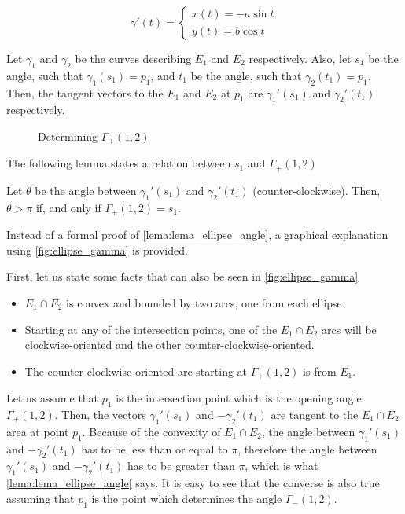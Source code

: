 \begin{equation}\label{eq:der_parametric_ellipse}
\gamma'(t) = \left\{
\begin{array}{l}
x(t)= -a\sin{t}\\
y(t)=b\cos{t}
\end{array}
\right.
\end{equation}

Let $\gamma_1$ and $\gamma_2$ be the curves describing $E_1$ and $E_2$ respectively. Also, let $s_1$ be the angle, such that $\gamma_1(s_1)=p_1$, and $t_1$ be the angle, such that $\gamma_2(t_1)=p_1$.
Then, the tangent vectors to the $E_1$ and $E_2$ at $p_1$ are $\gamma_1'(s_1)$ and $\gamma_2'(t_1)$ respectively.

\begin{figure}[H]
\centering

    \caption{Determining $\Gamma_+(1,2)$}
    
    \fautor
    \label{fig:ellipse_gamma}
\end{figure}

The following lemma states a relation between $s_1$ and $\Gamma_+(1,2)$

\begin{lema}\label{lema:lema_ellipse_angle}
	Let $\theta$ be the angle between $\gamma_1'(s_1)$ and $\gamma_2'(t_1)$ (counter-clockwise). Then, $\theta > \pi$ if, and only if $\Gamma_+(1,2)=s_1$.
\end{lema}

Instead of a formal proof of \autoref{lema:lema_ellipse_angle}, a graphical explanation using \autoref{fig:ellipse_gamma} is provided.


First, let us state some facts that can also be seen in \autoref{fig:ellipse_gamma}

\begin{itemize}
    \item $E_1 \cap E_2$ is convex and bounded by two arcs, one from each ellipse.
    \item Starting at any of the intersection points, one of the $E_1 \cap E_2$ arcs will be clockwise-oriented and the other counter-clockwise-oriented.
    \item The counter-clockwise-oriented arc starting at $\Gamma_+(1,2)$ is from $E_1$.
\end{itemize}


Let us assume that $p_1$ is the intersection point which is the opening angle $\Gamma_+(1,2)$. Then, the vectors $\gamma_1'(s_1)$ and $-\gamma_2'(t_1)$ are tangent to the $E_1 \cap E_2$ area at point $p_1$. Because of the convexity of $E_1 \cap E_2$, the angle between $\gamma_1'(s_1)$ and $-\gamma_2'(t_1)$ has to be less than or equal to $\pi$, therefore the angle between $\gamma_1'(s_1)$ and $-\gamma_2'(t_1)$ has to be greater than $\pi$, which is what \autoref{lema:lema_ellipse_angle} says. It is easy to see that the converse is also true assuming that $p_1$ is the point which determines the angle $\Gamma_-(1,2)$. 


